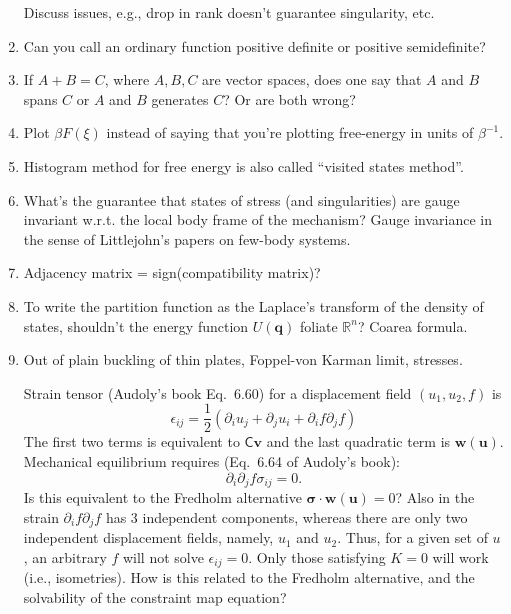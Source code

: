 \begin{enumerate}
  Discuss issues, e.g., drop in rank doesn't guarantee singularity, etc.
  \item Can you call an ordinary function positive definite or positive semidefinite?
  \item If $A + B = C$, where $A, B, C$ are vector spaces, does one say that $A$ and $B$ spans $C$ or $A$ and $B$ generates $C$?  Or are both wrong?
  \item Plot $\beta F(\xi)$ instead of saying that you're plotting free-energy in units of $\beta^{-1}$.
  \item Histogram method for free energy is also called ``visited states method''.
  \item What's the guarantee that states of stress (and singularities) are gauge invariant w.r.t. the local body frame of the mechanism?
    Gauge invariance in the sense of Littlejohn's papers on few-body systems.
  \item Adjacency matrix = sign(compatibility matrix)?
  \item To write the partition function as the Laplace's transform of the density of states, shouldn't the energy function $U(\bm{q})$ foliate $\mathbb{R}^{n}$? Coarea formula.

  \item Out of plain buckling of thin plates, Foppel-von Karman limit, stresses.

    Strain tensor (Audoly's book Eq.~6.60) for a displacement field $(u_{1}, u_{2}, f)$ is
    \begin{equation}
      \epsilon_{ij} = \frac{1}{2}\left(\partial_{i} u_{j} + \partial_{j} u_{i} + \partial_{i}f \partial_{j}f\right)
    \end{equation}
    The first two terms is equivalent to $\mathsf{C}\bm{v}$ and the last quadratic term is $\bm{w}(\bm{u})$.
    Mechanical equilibrium requires (Eq.~6.64 of Audoly's book):
    \begin{equation}
      \partial_{i}\partial_{j} f \sigma_{ij} = 0.
    \end{equation}
    Is this equivalent to the Fredholm alternative $\bm{\sigma}\cdot\bm{w}(\bm{u}) = 0$?
    Also in the strain $\partial_{i}f \partial_{j} f$ has 3 independent components, whereas there are only two independent displacement fields, namely, $u_{1}$ and $u_{2}$.  Thus, for a given set of $u$, an arbitrary $f$ will not solve $\epsilon_{ij} = 0$.  Only those satisfying $K = 0$ will work (i.e., isometries).
    How is this related to the Fredholm alternative, and the solvability of the constraint map equation?
\end{enumerate}

